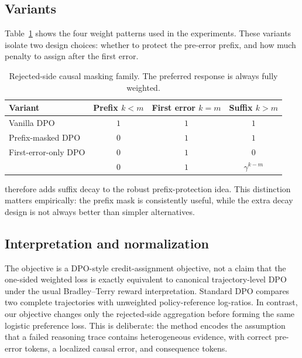 \subsection{Variants}

Table~\ref{tab:mask-family} shows the four weight patterns used in the experiments. These variants isolate two design choices: whether to protect the pre-error prefix, and how much penalty to assign after the first error.

\begin{table}[t]
\caption{Rejected-side causal masking family. The preferred response is always fully weighted.}
\label{tab:mask-family}
\begin{center}
\begin{tabular}{lccc}
\toprule
Variant & Prefix $k<m$ & First error $k=m$ & Suffix $k>m$ \\
\midrule
Vanilla DPO & $1$ & $1$ & $1$ \\
Prefix-masked DPO & $0$ & $1$ & $1$ \\
First-error-only DPO & $0$ & $1$ & $0$ \\
\cmdpo{} & $0$ & $1$ & $\gamma^{k-m}$ \\
\bottomrule
\end{tabular}
\end{center}
\end{table}

\cmdpo{} therefore adds suffix decay to the robust prefix-protection idea. This distinction matters empirically: the prefix mask is consistently useful, while the extra decay design is not always better than simpler alternatives.

\subsection{Interpretation and normalization}

The objective is a DPO-style credit-assignment objective, not a claim that the one-sided weighted loss is exactly equivalent to canonical trajectory-level DPO under the usual Bradley--Terry reward interpretation. Standard DPO compares two complete trajectories with unweighted policy-reference log-ratios. In contrast, our objective changes only the rejected-side aggregation before forming the same logistic preference loss. This is deliberate: the method encodes the assumption that a failed reasoning trace contains heterogeneous evidence, with correct pre-error tokens, a localized causal error, and consequence tokens.

